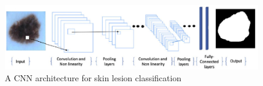 \begin{figure}
    \centerline{\includegraphics[width=1\columnwidth]{03-neural-networks-in-tumor-detection/figures/cnn-architecture-image-classification.png}}
    \caption{A CNN architecture for skin lesion classification}
    \label{figure:sample-cnn-architecture-skin-lesion-classification}
\end{figure}
